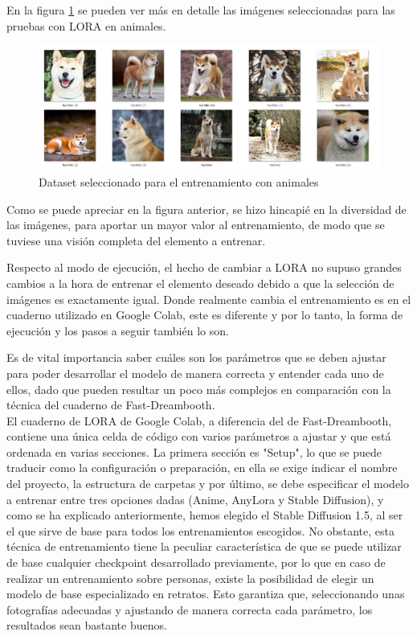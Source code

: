 En la figura \ref{fig:datasethachi} se pueden ver más en detalle las imágenes seleccionadas para las pruebas con LORA en animales.

\begin{figure}[h]
	\centering
	\includegraphics[width = 1
	\textwidth]{Imagenes/Vectorial/dataset_hachiko.png}
	\caption{Dataset seleccionado para el entrenamiento con animales}
	\label{fig:datasethachi}
\end{figure}

Como se puede apreciar en la figura anterior, se hizo hincapié en la diversidad de las imágenes, para aportar un mayor valor al entrenamiento, de modo que se tuviese una visión completa del elemento a entrenar.

Respecto al modo de ejecución, el hecho de cambiar a LORA no supuso grandes cambios a la hora de entrenar el elemento deseado debido a que la selección de imágenes es exactamente igual. Donde realmente cambia el entrenamiento es en el cuaderno utilizado en Google Colab, este es diferente y por lo tanto, la forma de ejecución y los pasos a seguir también lo son. 

Es de vital importancia saber cuáles son los parámetros que se deben ajustar para poder desarrollar el modelo de manera correcta y entender cada uno de ellos, dado que pueden resultar un poco más complejos en comparación con la técnica del cuaderno de Fast-Dreambooth.\\

El cuaderno de LORA de Google Colab, a diferencia del de Fast-Dreambooth, contiene una única celda de código con varios parámetros a ajustar y que  está ordenada en varias secciones. La primera sección es "Setup", lo que se puede traducir como la configuración o preparación, en ella se exige indicar el nombre del proyecto, la estructura de carpetas y por último, se debe especificar el modelo a entrenar entre tres opciones dadas (Anime, AnyLora y Stable Diffusion), y como se ha explicado anteriormente, hemos elegido el Stable Diffusion 1.5, al ser el que sirve de base para todos los entrenamientos escogidos. No obstante, esta técnica de entrenamiento tiene la peculiar característica de que se puede utilizar de base cualquier checkpoint desarrollado previamente, por lo que en caso de realizar un entrenamiento sobre personas, existe la posibilidad de elegir un modelo de base especializado en retratos. Esto garantiza que, seleccionando unas fotografías adecuadas y ajustando de manera correcta cada parámetro, los resultados sean bastante buenos.\\

